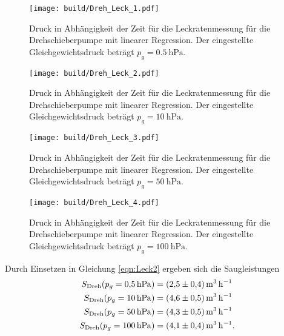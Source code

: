 \begin{figure}
    \centering
    \texttt{[image: build/Dreh\_Leck\_1.pdf]}
    \caption{Druck in Abhängigkeit der Zeit für die Leckratenmessung für die Drehschieberpumpe mit linearer Regression. Der eingestellte Gleichgewichtsdruck beträgt $p_g=\SI{0.5}{\hecto\pascal}$.}
    \label{fig:dreh_leck1}
\end{figure}
\begin{figure}
    \centering
    \texttt{[image: build/Dreh\_Leck\_2.pdf]}
    \caption{Druck in Abhängigkeit der Zeit für die Leckratenmessung für die Drehschieberpumpe mit linearer Regression. Der eingestellte Gleichgewichtsdruck beträgt $p_g=\SI{10}{\hecto\pascal}$.}
    \label{fig:dreh_leck2}
\end{figure}
\begin{figure}
    \centering
    \texttt{[image: build/Dreh\_Leck\_3.pdf]}
    \caption{Druck in Abhängigkeit der Zeit für die Leckratenmessung für die Drehschieberpumpe mit linearer Regression. Der eingestellte Gleichgewichtsdruck beträgt $p_g=\SI{50}{\hecto\pascal}$.}
    \label{fig:dreh_leck3}
\end{figure}
\begin{figure}
    \centering
    \texttt{[image: build/Dreh\_Leck\_4.pdf]}
    \caption{Druck in Abhängigkeit der Zeit für die Leckratenmessung für die Drehschieberpumpe mit linearer Regression. Der eingestellte Gleichgewichtsdruck beträgt $p_g=\SI{100}{\hecto\pascal}$.}
    \label{fig:dreh_leck4}
\end{figure}
\noindent
Durch Einsetzen in Gleichung \ref{eqn:Leck2} ergeben sich die Saugleistungen
\begin{align*}
  S_\text{Dreh}(p_g=\SI{0.5}{\hecto\pascal})&=\SI[per-mode=reciprocal]{2.5 \pm 0.4}{\cubic\metre\per\hour}\\
  S_\text{Dreh}(p_g=\SI{10}{\hecto\pascal})&=\SI[per-mode=reciprocal]{4.6 \pm 0.5}{\cubic\metre\per\hour}\\
  S_\text{Dreh}(p_g=\SI{50}{\hecto\pascal})&=\SI[per-mode=reciprocal]{4.3 \pm 0.5}{\cubic\metre\per\hour}\\
  S_\text{Dreh}(p_g=\SI{100}{\hecto\pascal})&=\SI[per-mode=reciprocal]{4.1 \pm 0.4}{\cubic\metre\per\hour}.
\end{align*}
